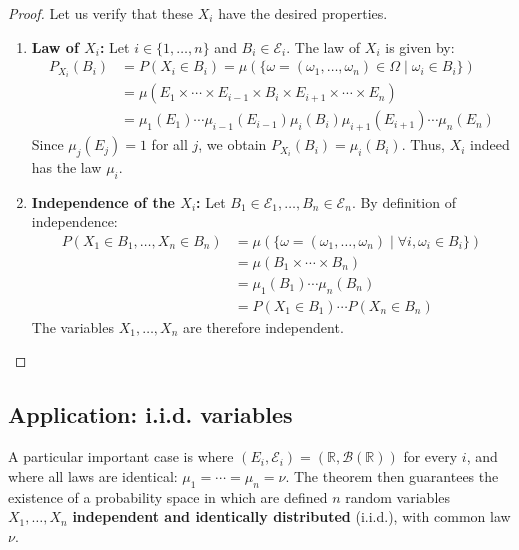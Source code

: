 \begin{proof}
Let us verify that these $X_i$ have the desired properties.
\begin{enumerate}
    \item \textbf{Law of $X_i$: } Let $i \in \{1, \ldots, n\}$ and $B_i \in \mathcal{E}_i$. The law of $X_i$ is given by:
    \begin{align*}
    P_{X_i}(B_i) &= P(X_i \in B_i) = \mu(\{\omega = (\omega_1, \ldots, \omega_n) \in \Omega \mid \omega_i \in B_i\}) \\
    &= \mu(E_1 \times \cdots \times E_{i-1} \times B_i \times E_{i+1} \times \cdots \times E_n) \\
    &= \mu_1(E_1) \cdots \mu_{i-1}(E_{i-1}) \mu_i(B_i) \mu_{i+1}(E_{i+1}) \cdots \mu_n(E_n)
    \end{align*}
    Since $\mu_j(E_j)=1$ for all $j$, we obtain $P_{X_i}(B_i) = \mu_i(B_i)$. Thus, $X_i$ indeed has the law $\mu_i$.
    \item \textbf{Independence of the $X_i$: } Let $B_1 \in \mathcal{E}_1, \ldots, B_n \in \mathcal{E}_n$. By definition of independence:
    \begin{align*}
    P(X_1 \in B_1, \ldots, X_n \in B_n) &= \mu(\{\omega = (\omega_1, \ldots, \omega_n) \mid \forall i, \omega_i \in B_i\}) \\
    &= \mu(B_1 \times \cdots \times B_n) \\
    &= \mu_1(B_1) \cdots \mu_n(B_n) \\
    &= P(X_1 \in B_1) \cdots P(X_n \in B_n)
    \end{align*}
    The variables $X_1, \ldots, X_n$ are therefore independent.
\end{enumerate}
\end{proof}%
\subsection{Application: i.i.d. variables}%
A particular important case is where $(E_i, \mathcal{E}_i) = (\mathbb{R}, \mathcal{B}(\mathbb{R}))$ for every $i$, and where all laws are identical: $\mu_1 = \cdots = \mu_n = \nu$. The theorem then guarantees the existence of a probability space in which are defined $n$ random variables $X_1, \ldots, X_n$ \textbf{independent and identically distributed} (i.i.d.), with common law $\nu$.%
